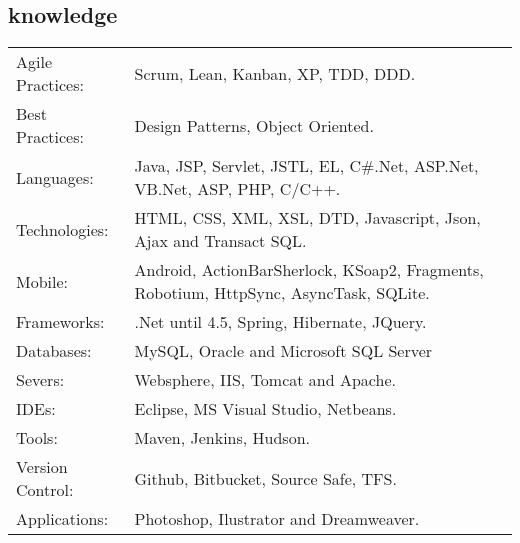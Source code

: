 \documentclass[a4paper, oneside, final]{scrartcl}
\begin{document}
\begin{center}
\section{knowledge}

\begin{tabularx}{0.97\linewidth}{p{3.5cm}X}
Agile Practices: & Scrum, Lean, Kanban, XP, TDD, DDD.\\
Best Practices:  & Design Patterns, Object Oriented.\\
Languages:       & Java, JSP, Servlet, JSTL, EL, C\#.Net, ASP.Net, VB.Net, ASP, PHP, C/C++.\\
Technologies:    & HTML, CSS, XML, XSL, DTD, Javascript, Json, Ajax and Transact SQL.\\
Mobile:          & Android, ActionBarSherlock, KSoap2, Fragments, Robotium, HttpSync, AsyncTask, SQLite.\\
Frameworks:      & .Net until 4.5, Spring, Hibernate, JQuery.\\
Databases:       & MySQL, Oracle and Microsoft SQL Server \\
Severs:          & Websphere, IIS, Tomcat and Apache.\\
IDEs:            & Eclipse, MS Visual Studio, Netbeans.\\
Tools:			 & Maven, Jenkins, Hudson.\\
Version Control: & Github, Bitbucket, Source Safe, TFS.\\
Applications:    & Photoshop, Ilustrator and Dreamweaver.\\
\end{tabularx}


\end{center}
\end{document}
